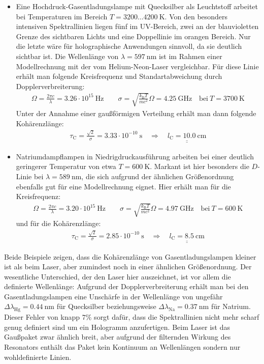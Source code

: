 \documentclass[german,  %
parskip=full,  %
]{scrartcl}
\begin{document}
\begin{itemize}
\item Eine Hochdruck-Gasentladungslampe mit Quecksilber als Leuchtstoff arbeitet bei Temperaturen im Bereich \(T = 3200 \hdots 4200 \ \mathrm{K}\). Von den besonders intensiven Spektrallinien liegen fünf im UV-Bereich, zwei an der blauvioletten Grenze des sichtbaren Lichts und eine Doppellinie im orangen Bereich. Nur die letzte wäre für holographische Anwendungen sinnvoll, da sie deutlich sichtbar ist. Die Wellenlänge von \(\lambda = 597 \ \mathrm{nm}\) ist im Rahmen einer Modellrechnung mit der vom Helium-Neon-Laser vergleichbar. Für diese Linie erhält man folgende Kreisfrequenz und Standartabweichung durch Dopplerverbreiterung:
\begin{align*}
\Omega = \frac{2\pi c}{\lambda} = 3.26\cdot 10^{15} \ \mathrm{Hz} \quad\quad \sigma = \sqrt{\frac{k_{\mathrm{B}} T}{mc^2}} \Omega = 4.25 \ \mathrm{GHz} \quad\text{bei} \ T = 3700 \ \mathrm{K}
\end{align*}
Unter der Annahme einer gaußförmigen Verteilung erhält man dann folgende Kohärenzlänge:
\begin{align*}
\tau_{\mathrm{C}} = \frac{\sqrt{2}}{\sigma} = 3.33\cdot 10^{-10} \ \mathrm{s} \quad\Longrightarrow\quad\underline{\underline{l_{\mathrm{C}} = 10.0 \ \mathrm{cm}}}
\end{align*}
\item Natriumdampflampen in Niedrigdruckausführung arbeiten bei einer deutlich geringerer Temperatur von etwa \(T = 600 \ \mathrm{K}\). Markant ist hier besonders die \(D\)-Linie bei \(\lambda = 589 \ \mathrm{nm}\), die sich aufgrund der ähnlichen Größenordnung ebenfalls gut für eine Modellrechnung eignet. Hier erhält man für die Kreisfrequenz:
\begin{align*}
\Omega = \frac{2\pi c}{\lambda} = 3.20\cdot 10^{15} \ \mathrm{Hz} \quad\quad \sigma = \sqrt{\frac{k_{\mathrm{B}} T}{mc^2}} \Omega = 4.97 \ \mathrm{GHz} \quad\text{bei} \ T = 600 \ \mathrm{K}
\end{align*}
und für die Kohärenzlänge:
\begin{align*}
\tau_{\mathrm{C}} = \frac{\sqrt{2}}{\sigma} = 2.85\cdot 10^{-10} \ \mathrm{s} \quad\Longrightarrow\quad\underline{\underline{l_{\mathrm{C}} = 8.5 \ \mathrm{cm}}}
\end{align*}
\end{itemize}
Beide Beispiele zeigen, dass die Kohärenzlänge von Gasentladungslampen kleiner ist als beim Laser, aber zumindest noch in einer ähnlichen Größenordnung. Der wesentliche Unterschied, der den Laser hier auszeichnet, ist vor allem die definierte Wellenlänge: Aufgrund der Dopplerverbreiterung erhält man bei den Gasentladungslampen eine Unschärfe in der Wellenlänge von ungefähr \(\Delta\lambda_{\mathrm{Hg}} = 0.44 \ \mathrm{nm}\) für Quecksilber beziehungsweise \(\Delta\lambda_{\mathrm{Na}} = 0.37 \ \mathrm{nm}\) für Natrium. Dieser Fehler von knapp \(7 \%\) sorgt dafür, dass die Spektrallinien nicht mehr scharf genug definiert sind um ein Hologramm anzufertigen. Beim Laser ist das Gaußpaket zwar ähnlich breit, aber aufgrund der filternden Wirkung des Resonators enthält das Paket kein Kontinuum an Wellenlängen sondern nur wohldefinierte Linien.
\end{document}
